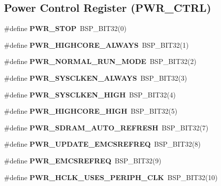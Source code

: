 \subsection*{Power Control Register (P\+W\+R\+\_\+\+C\+T\+RL)}
\begin{DoxyCompactItemize}
\item 
\mbox{\label{group__lpc32xx__reg_ga4dc06c6ad00789acf614caed910fd843}} 
\#define {\bfseries P\+W\+R\+\_\+\+S\+T\+OP}~B\+S\+P\+\_\+\+B\+I\+T32(0)
\item 
\mbox{\label{group__lpc32xx__reg_ga5b183a5553f43171778d35fb6c07432c}} 
\#define {\bfseries P\+W\+R\+\_\+\+H\+I\+G\+H\+C\+O\+R\+E\+\_\+\+A\+L\+W\+A\+YS}~B\+S\+P\+\_\+\+B\+I\+T32(1)
\item 
\mbox{\label{group__lpc32xx__reg_ga10be60e09e319ba249da38ec4cd7d595}} 
\#define {\bfseries P\+W\+R\+\_\+\+N\+O\+R\+M\+A\+L\+\_\+\+R\+U\+N\+\_\+\+M\+O\+DE}~B\+S\+P\+\_\+\+B\+I\+T32(2)
\item 
\mbox{\label{group__lpc32xx__reg_ga33acb757b09a076798a93ab12245b254}} 
\#define {\bfseries P\+W\+R\+\_\+\+S\+Y\+S\+C\+L\+K\+E\+N\+\_\+\+A\+L\+W\+A\+YS}~B\+S\+P\+\_\+\+B\+I\+T32(3)
\item 
\mbox{\label{group__lpc32xx__reg_gab48501869df3848c2f1fc22ae9d157c0}} 
\#define {\bfseries P\+W\+R\+\_\+\+S\+Y\+S\+C\+L\+K\+E\+N\+\_\+\+H\+I\+GH}~B\+S\+P\+\_\+\+B\+I\+T32(4)
\item 
\mbox{\label{group__lpc32xx__reg_ga963daf2d5de53332bc2ae385961f1d08}} 
\#define {\bfseries P\+W\+R\+\_\+\+H\+I\+G\+H\+C\+O\+R\+E\+\_\+\+H\+I\+GH}~B\+S\+P\+\_\+\+B\+I\+T32(5)
\item 
\mbox{\label{group__lpc32xx__reg_ga9cb46bc0edc249b34e935458bc758ef1}} 
\#define {\bfseries P\+W\+R\+\_\+\+S\+D\+R\+A\+M\+\_\+\+A\+U\+T\+O\+\_\+\+R\+E\+F\+R\+E\+SH}~B\+S\+P\+\_\+\+B\+I\+T32(7)
\item 
\mbox{\label{group__lpc32xx__reg_ga709d1706281f161107829d3144ea0934}} 
\#define {\bfseries P\+W\+R\+\_\+\+U\+P\+D\+A\+T\+E\+\_\+\+E\+M\+C\+S\+R\+E\+F\+R\+EQ}~B\+S\+P\+\_\+\+B\+I\+T32(8)
\item 
\mbox{\label{group__lpc32xx__reg_ga35bd718f2bad1578399e4ad491b3328f}} 
\#define {\bfseries P\+W\+R\+\_\+\+E\+M\+C\+S\+R\+E\+F\+R\+EQ}~B\+S\+P\+\_\+\+B\+I\+T32(9)
\item 
\mbox{\label{group__lpc32xx__reg_gaaf0809115ffb0d4f3e7b066dbd9eef8f}} 
\#define {\bfseries P\+W\+R\+\_\+\+H\+C\+L\+K\+\_\+\+U\+S\+E\+S\+\_\+\+P\+E\+R\+I\+P\+H\+\_\+\+C\+LK}~B\+S\+P\+\_\+\+B\+I\+T32(10)
\end{DoxyCompactItemize}
